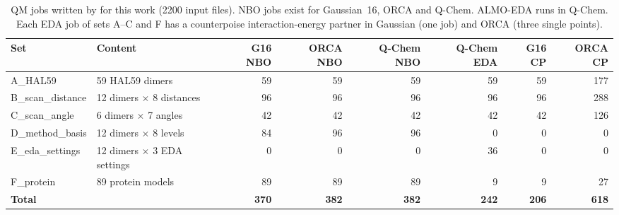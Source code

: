 \begin{table}[!htbp]\centering\footnotesize
\caption{QM jobs written by \BX{} for this work (2200 input files). NBO jobs exist for Gaussian~16, ORCA and Q-Chem. ALMO-EDA runs in Q-Chem. Each EDA job of sets A--C and F has a counterpoise interaction-energy partner in Gaussian (one job) and ORCA (three single points).}\label{tab:jobs}
\begin{tabular}{llrrrrrr}\toprule Set & Content & G16 NBO & ORCA NBO & Q-Chem NBO & Q-Chem EDA & G16 CP & ORCA CP\\\midrule
A\_HAL59 & 59 HAL59 dimers & 59 & 59 & 59 & 59 & 59 & 177\\
B\_scan\_distance & 12 dimers $\times$ 8 distances & 96 & 96 & 96 & 96 & 96 & 288\\
C\_scan\_angle & 6 dimers $\times$ 7 angles & 42 & 42 & 42 & 42 & 42 & 126\\
D\_method\_basis & 12 dimers $\times$ 8 levels & 84 & 96 & 96 & 0 & 0 & 0\\
E\_eda\_settings & 12 dimers $\times$ 3 EDA settings & 0 & 0 & 0 & 36 & 0 & 0\\
F\_protein & 89 protein models & 89 & 89 & 89 & 9 & 9 & 27\\
\textbf{Total} &  & \textbf{370} & \textbf{382} & \textbf{382} & \textbf{242} & \textbf{206} & \textbf{618}\\
\bottomrule\end{tabular}\end{table}
